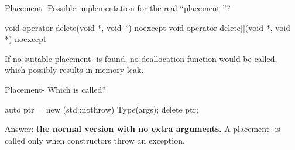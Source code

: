 \documentclass{beamer}
\begin{document}
\begin{frame}[fragile]{Placement-}
  Possible implementation for the real ``placement-''?
  \pause
  \begin{cpp}
void operator delete(void *, void *) noexcept {}
void operator delete[](void *, void *) noexcept {}
  \end{cpp}
  \pause
  \begin{notice}
    If no suitable placement- is found, no deallocation function would be called, which possibly results in memory leak.
  \end{notice}
\end{frame}

\begin{frame}[fragile]{Placement-}
  Which  is called?
  \begin{cpp}
auto ptr = new (std::nothrow) Type(args);
delete ptr;
  \end{cpp}
  \pause
  Answer: \textbf{the normal version with no extra arguments.} A placement- is called only when constructors throw an exception.
\end{frame}
\end{document}
